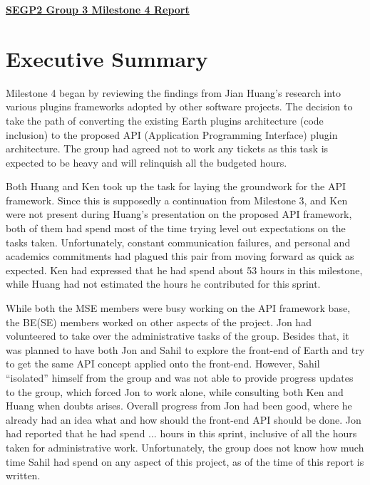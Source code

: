 \documentclass{article}
\begin{document}
\pagestyle{headings}

\begin{center}
{\textbf{\underline{SEGP2 Group 3 Milestone 4 Report}}}
\end{center}


\section*{Executive Summary}

Milestone 4 began by reviewing the findings from Jian Huang's research into various plugins frameworks adopted by other software projects. The decision to take the path of converting the existing Earth plugins architecture (code inclusion) to the proposed API (Application Programming Interface) plugin architecture. The group had agreed not to work any tickets as this task is expected to be heavy and will relinquish all the budgeted hours. 

Both Huang and Ken took up the task for laying the groundwork for the API framework. Since this is supposedly a continuation from Milestone 3, and Ken were not present during Huang's presentation on the proposed API framework, both of them had spend most of the time trying level out expectations on the tasks taken. Unfortunately, constant communication failures, and personal and academics commitments had plagued this pair from moving forward as quick as expected. Ken had expressed that he had spend about 53 hours in this milestone, while Huang had not estimated the hours he contributed for this sprint. 

While both the MSE members were busy working on the API framework base, the BE(SE) members worked on other aspects of the project. Jon had volunteered to take over the administrative tasks of the group. Besides that, it was planned to have both Jon and Sahil to explore the front-end of Earth and try to get the same API concept applied onto the front-end. However, Sahil ``isolated'' himself from the group and was not able to provide progress updates to the group, which forced Jon to work alone, while consulting both Ken and Huang when doubts arises. Overall progress from Jon had been good, where he already had an idea what and how should the front-end API should be done. Jon had reported that he had spend ... hours in this sprint, inclusive of all the hours taken for administrative work. Unfortunately, the group does not know how much time Sahil had spend on any aspect of this project, as of the time of this report is written. 
\end{document}
